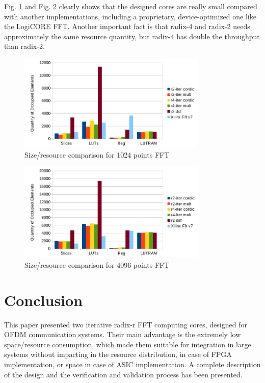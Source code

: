 \documentclass[conference]{IEEEtran}
\begin{document}
Fig. \ref{fig:sizecomp1024} and Fig. \ref{fig:sizecomp4096} clearly shows that the designed cores are really small compared 
with another implementations, including a proprietary, device-optimized one like the LogiCORE FFT. Another important fact is that 
radix-4 and radix-2 needs approximately the same resource quantity, but radix-4 has double the throughput than radix-2.
\begin{figure}[htb!]
        \centering
        \includegraphics[width=9cm]{./figures/sizecomp1024.png}
        \caption{Size/resource comparison for 1024 points FFT}
        \label{fig:sizecomp1024}
\end{figure}

\begin{figure}[htb!]
        \centering
        \includegraphics[width=9cm]{./figures/sizecomp4096.png}
        \caption{Size/resource comparison for 4096 points FFT}
        \label{fig:sizecomp4096}
\end{figure}  

\section{Conclusion}
This paper presented two iterative radix-r FFT computing cores, designed for OFDM
communication systems. Their main advantage is the extremely low space/resource consumption, which made them suitable for
integration in large systems without impacting in the resource distribution, in case of FPGA implementation, or space in case of
ASIC implementation. A complete description of the design and the verification and validation process has been presented.
 
\end{document}
